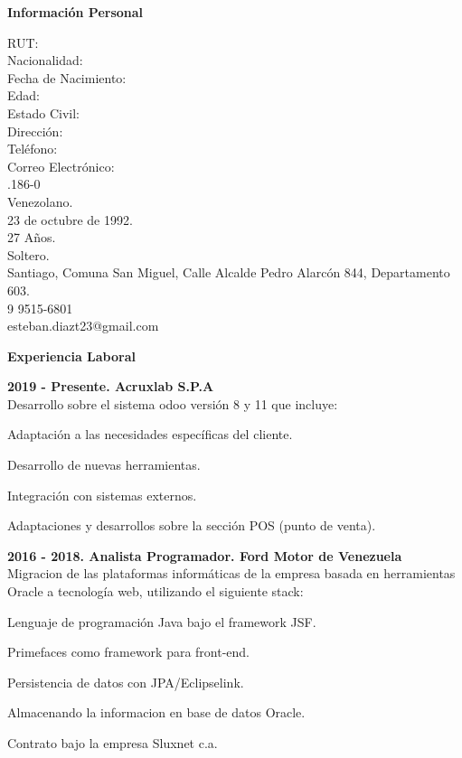 \documentclass[a4paper,12pt,final]{memoir}
\newcommand{\Sep}{\vspace{1.5em}}
\newcommand{\SmallSep}{\vspace{0.5em}}
\newcommand{\CVSection}[1]
	{\Large\textbf{#1}\par
	\SmallSep\normalsize\normalfont}
\newcommand{\CVItem}[1]
	{\textbf{\color{RoyalBlue} #1}}
\begin{document}
\CVSection{Información Personal}
\setlength{\columnsep}{-3.5cm}      %
\begin{multicols}{2}
RUT: \\
Nacionalidad: \\
Fecha de Nacimiento: \\
Edad: \\
Estado Civil: \\
Dirección: \\
\newline
Teléfono: \\
Correo Electrónico: \\
\vfill
{}.186-0\\
Venezolano.\\
23 de octubre de 1992.\\
27 Años.\\
Soltero.\\
Santiago, Comuna San Miguel, Calle Alcalde Pedro Alarcón 844, Departamento 603.\\
9 9515-6801 \\
esteban.diazt23@gmail.com
\end{multicols}

\Sep

\CVSection{Experiencia Laboral}
\CVItem{2019 - Presente. Acruxlab S.P.A}\\
Desarrollo sobre el sistema odoo versión 8 y 11 que incluye:
\begin{compactitem}[\color{RoyalBlue}$\circ$]
	\item Adaptación a las necesidades específicas del cliente.
	\item Desarrollo de nuevas herramientas.
	\item Integración con sistemas externos.
	\item Adaptaciones y desarrollos sobre la sección POS (punto de venta).
\end{compactitem}

\SmallSep

\CVItem{2016 - 2018. Analista Programador. Ford Motor de Venezuela}\\
Migracion de las plataformas informáticas de la empresa basada en herramientas
Oracle a tecnología web, utilizando el siguiente stack:
\begin{compactitem}[\color{RoyalBlue}$\circ$]
	\item Lenguaje de programación Java bajo el framework JSF.
	\item Primefaces como framework para front-end.
	\item Persistencia de datos con JPA/Eclipselink.
	\item Almacenando la informacion en base de datos Oracle.
\end{compactitem}
Contrato bajo la empresa Sluxnet c.a.
\end{document}
